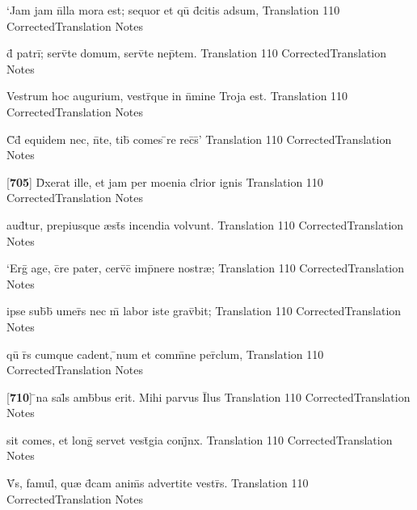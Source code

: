 \latline
  {`Jam jam n\={}lla mora est; sequor et qu\={} d\={}citis adsum,}
  { Translation }
  {110}
  { CorrectedTranslation }
  { Notes }


\latline
  {d\={\macron {\i}} patri\={\macron {\i}}; serv\={}te domum, serv\={}te nep\={}tem.}
  { Translation }
  {110}
  { CorrectedTranslation }
  { Notes }


\latline
  {Vestrum hoc augurium, vestr\={}que in n\={}mine Troja est.}
  { Translation }
  {110}
  { CorrectedTranslation }
  { Notes }


\latline
  {C\={}d\={} equidem nec, n\={}te, tib\={\macron {\i}} comes \={\macron {\i}}re rec\={}s\={}'}
  { Translation }
  {110}
  { CorrectedTranslation }
  { Notes }


\latline
  {[\textbf{705}] D\={\macron {\i}}xerat ille, et jam per moenia cl\={}rior ignis}
  { Translation }
  {110}
  { CorrectedTranslation }
  { Notes }


\latline
  {aud\={\macron {\i}}tur, prepiusque {\ae}st\={}s incendia volvunt.}
  { Translation }
  {110}
  { CorrectedTranslation }
  { Notes }


\latline
  {`Erg\={} age, c\={}re pater, cerv\={\macron {\i}}c\={\macron {\i}} imp\={}nere nostr{\ae};}
  { Translation }
  {110}
  { CorrectedTranslation }
  { Notes }


\latline
  {ipse sub\={\macron {\i}}b\={} umer\={\macron {\i}}s nec m\={} labor iste grav\={}bit;}
  { Translation }
  {110}
  { CorrectedTranslation }
  { Notes }


\latline
  {qu\={} r\={}s cumque cadent, \={}num et comm\={}ne per\={\macron {\i}}clum,}
  { Translation }
  {110}
  { CorrectedTranslation }
  { Notes }


\latline
  {[\textbf{710}] \={}na sal\={}s amb\={}bus erit.  Mihi parvus I\={}lus}
  { Translation }
  {110}
  { CorrectedTranslation }
  { Notes }


\latline
  {sit comes, et long\={} servet vest\={\macron {\i}}gia conj\={}nx.}
  { Translation }
  {110}
  { CorrectedTranslation }
  { Notes }


\latline
  {V\={}s, famul\={\macron {\i}}, qu{\ae} d\={\macron {\i}}cam anim\={\macron {\i}}s advertite vestr\={\macron {\i}}s.}
  { Translation }
  {110}
  { CorrectedTranslation }
  { Notes }


